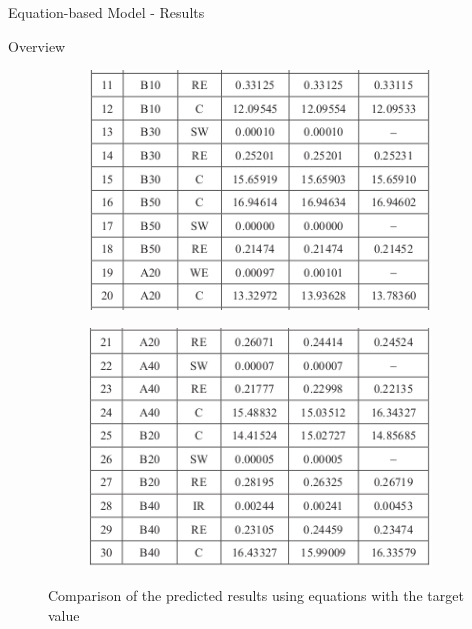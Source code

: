 \documentclass{beamer}
\begin{document}
\begin{frame}{Equation-based Model - Results}
\begin{block}{Overview}
\begin{figure}
\begin{subfigure}[b]{0.325\textwidth}
             \centering
             \includegraphics[width=\textwidth]{Figures/Eq-overview2.png}
         \end{subfigure}
         \hfill
         \begin{subfigure}[b]{0.325\textwidth}
             \centering
             \includegraphics[width=\textwidth]{Figures/Eq-overview3.png}
         \end{subfigure}\vspace{-1mm}
         \caption{Comparison of the predicted results using equations with the target value}
    \end{figure}\;\\\vspace{-28pt}
    \end{block}
\end{frame}
\end{document}
